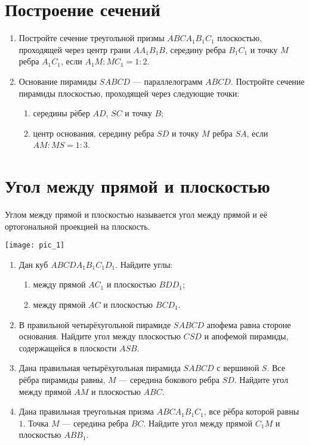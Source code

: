 \documentclass[12pt, a4paper]{article}
\begin{document}
	
  
\section{Построение сечений}
\begin{enumerate}
	\item Постройте сечение треугольной призмы $ABCA_1B_1C_1$ плоскостью, проходящей через центр грани $AA_1B_1B$, середину ребра $B_1C_1$ и точку $M$ ребра $A_1C_1$,
	если $A_1M:MC_1=1 : 2$.
	\item Основание пирамиды $SABCD$ --- параллелограмм $ABCD$. Постройте сечение пирамиды плоскостью, проходящей через следующие точки:
	\begin{enumerate}[label=\asbuk*)]
		\item середины рёбер $AD$, $SC$ и точку $B$;
		\item центр основания, середину ребра $SD$ и точку $M$ ребра $SA$, если $AM :MS = 1 : 3$.
	\end{enumerate}
\end{enumerate}
\section{Угол между прямой и плоскостью}
	Углом между прямой и плоскостью называется угол между прямой
	и её ортогональной проекцией на плоскость.
	\begin{center}
		\texttt{[image: pic\_1]}
	\end{center}
	\begin{enumerate}
		\item Дан куб $ABCDA_1B_1C_1D_1$. Найдите углы:
		\begin{enumerate}[label=\asbuk*)]
			\item между прямой $AC_1$ и плоскостью $BDD_1$;
			\item между прямой $AC$ и плоскостью $BCD_1$.
		\end{enumerate}
		\item В правильной четырёхугольной пирамиде $SABCD$ апофема равна стороне основания. Найдите угол между плоскостью $CSD$ и апофемой пирамиды, содержащейся в плоскости $ASB$.
		\item Дана правильная четырёхугольная пирамида $SABCD$ с вершиной $S$. Все рёбра пирамиды равны, $M$ --- середина бокового ребра $SD$. Найдите угол между прямой $AM$ и плоскостью $ABC$.
		\item Дана правильная треугольная призма $ABCA_1B_1C_1$, все рёбра которой равны $1$. Точка $M$ --- середина ребра $BC$. Найдите угол между прямой $C_1M$ и плоскостью $ABB_1$.
	\end{enumerate}
\end{document}
